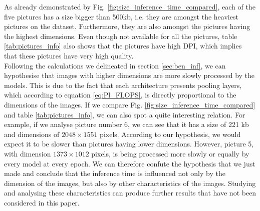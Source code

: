 As already demonstrated by Fig. \ref{fig:size_inference_time_compared}, each of the five pictures has a size bigger than 500kb, i.e. they are amongst the heaviest pictures on the dataset. Furthermore, they are also amongst the pictures having the highest dimensions. Even though not available for all the pictures, table \ref{tab:pictures_info} also shows that the pictures have high DPI, which implies that these pictures have very high quality. \\
Following the calculations we delineated in section \ref{sec:ben_inf}, we can hypothesise that images with higher dimensions are more slowly processed by the models. This is due to the fact that each architecture presents pooling layers, which according to equation \ref{eq:Pl_FLOPS}, is directly proportional to the dimensions of the images. If we compare Fig. \ref{fig:size_inference_time_compared} and table \ref{tab:pictures_info}, we can also spot a quite interesting relation.
For example, if we analyse picture number 6, we can see that it has a size of 221 kb and dimensions of $2048 \times 1551$ pixels. According to our hypothesis, we would expect it to be slower than pictures having lower dimensions. However, picture 5, with dimension $1373 \times 1012$ pixels, is being processed more slowly or equally by every model at every epoch. We can therefore confute the hypothesis that we just made and conclude that the inference time is influenced not only by the dimension of the images, but also by other characteristics of the images. Studying and analysing these characteristics can produce further results that have not been considered in this paper. %


